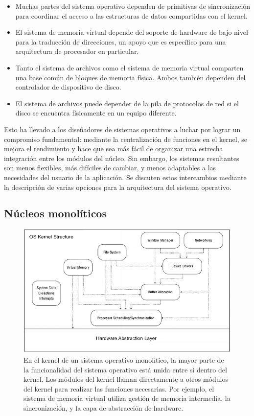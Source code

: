 \documentclass[10pt]{book}
\begin{document}
\begin{itemize}
\item Muchas partes del sistema operativo dependen de primitivas de sincronización para coordinar el acceso a las estructuras de datos compartidas con el kernel.
\item El sistema de memoria virtual depende del soporte de hardware de bajo nivel para la traducción de direcciones, un apoyo que es específico para una arquitectura de procesador en particular.
\item Tanto el sistema de archivos como el sistema de memoria virtual comparten una base común de bloques de memoria física. Ambos también dependen del controlador de dispositivo de disco.
\item El sistema de archivos puede depender de la pila de protocolos de red si el disco se encuentra físicamente en un equipo diferente.
\end{itemize}

Esto ha llevado a los diseñadores de sistemas operativos a luchar por lograr un compromiso fundamental: mediante la centralización de funciones en el kernel, se mejora el rendimiento y hace que sea más fácil de organizar una estrecha integración entre los módulos del núcleo. Sin embargo, los sistemas resultantes son menos flexibles, más difíciles de cambiar, y menos adaptables a las necesidades del usuario de la aplicación. Se discuten estos intercambios mediante la descripción de varias opciones para la arquitectura del sistema operativo.

\subsection{Núcleos monolíticos}
\begin{figure}[tbhp]
\centerline{\includegraphics[scale=0.45]{img/fig0303}}
\caption{En el kernel de un sistema operativo monolítico, la mayor parte de la funcionalidad del sistema operativo está unida entre sí dentro del kernel. Los módulos del kernel llaman directamente a otros módulos del kernel para realizar las funciones necesarias. Por ejemplo, el sistema de memoria virtual utiliza gestión de memoria intermedia, la sincronización, y la capa de abstracción de hardware.}
\label{fig0303}
\end{figure}
\end{document}

